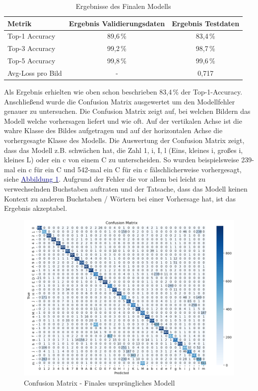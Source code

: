 \documentclass[12pt,oneside]{article}
\begin{document}
  
  \begin{table}[h!]
  	\centering
  	\begin{tabular}{|l|c|c|}
  		\hline
  		\rowcolor{lightgray} \textbf{Metrik} & \textbf{Ergebnis Validierungsdaten} & \textbf{Ergebnis Testdaten} \\ \hline
  		Top-1 Accuracy & 89,6\,\% & 83,4\,\% \\ \hline
  		Top-3 Accuracy & 99,2\,\% & 98,7\,\% \\ \hline
  		Top-5 Accuracy & 99,8\,\% & 99,6\,\% \\ \hline
  		Avg-Loss pro Bild & - & 0,717 \\ \hline
  	\end{tabular}
  	\caption{Ergebnisse des Finalen Modells}
  \end{table}
  
  
  Als Ergebnis erhielten wie oben schon beschrieben 83,4\,\% der Top-1-Accuracy. \\
  Anschließend wurde die Confusion Matrix ausgewertet um den Modellfehler genauer zu untersuchen. Die Confusion Matrix zeigt auf, bei welchen Bildern das Modell welche vorhersagen liefert und wie oft. Auf der vertikalen Achse ist die wahre Klasse des Bildes aufgetragen und auf der horizontalen Achse die vorhergesagte Klasse des Modells.
  Die Auswertung der Confusion Matrix zeigt, dass das Modell z.B. schwächen hat, die Zahl 1, i, I, l (Eins, kleines i, großes i, kleines L) oder ein c von einem C zu unterscheiden. So wurden beispielsweise 239-mal ein c für ein C und 542-mal ein C für ein c fälschlicherweise vorhergesagt, siehe \hyperref[fig:ConfusionMatrixTrainTestFinal]{\textcolor{darkblue}{Abbildung \ref*{fig:ConfusionMatrixTrainTestFinal}}}. Aufgrund der Fehler die vor allem bei leicht zu verwechselnden Buchstaben auftraten und der Tatsache, dass das Modell keinen Kontext zu anderen Buchstaben / Wörtern bei einer Vorhersage hat, ist das Ergebnis akzeptabel.
  
  
  \begin{figure}[h!]
  	\centering
  	\includegraphics[width=0.9\linewidth]{Bilder/ConfusionMatrix/TrainTestFinal}
  	\caption[Confusion Matrix - Finales ursprüngliches Modell]{Confusion Matrix - Finales ursprüngliches Modell}
  	\label{fig:ConfusionMatrixTrainTestFinal}
  \end{figure}
  
\end{document}
